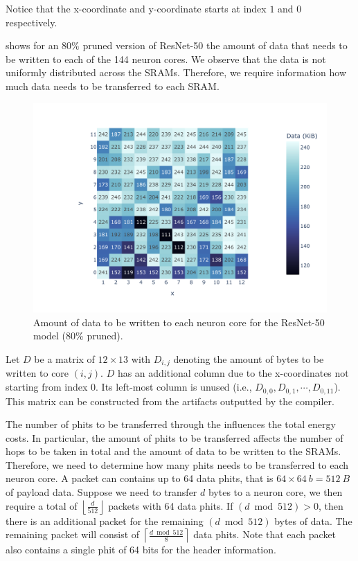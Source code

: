 Notice that the x-coordinate and y-coordinate starts at index $1$ and $0$ respectively.

 shows for an $80\%$ pruned version of ResNet-50 the amount of data that needs to be written to each of the 144 neuron cores.
We observe that the data is not uniformly distributed across the SRAMs.
Therefore, we require information how much data needs to be transferred to each SRAM.

\begin{figure}[hbtp]
    \centering
    \includegraphics[clip, trim=80 20 10 30, width=0.8\linewidth]{assets/resnet50_coredata_heatmap.pdf}
    \caption{Amount of data to be written to each neuron core for the ResNet-50 model (80\% pruned).}
    \label{fig:model_data_heapmap}
\end{figure}

Let $D$ be a matrix of $12 \times 13$ with $D_{i,j}$ denoting the amount of bytes to be written to core $\left( i,j \right)$.
$D$ has an additional column due to the x-coordinates not starting from index $0$.
Its left-most column is unused (i.e., $D_{0,0}, D_{0,1}, \cdots, D_{0,11}$).
This matrix can be constructed from the artifacts outputted by the compiler.

The number of phits to be transferred through the \confignoc{} influences the total energy costs.
In particular, the amount of phits to be transferred affects the number of hops to be taken in total and the amount of data to be written to the SRAMs.
Therefore, we need to determine how many phits needs to be transferred to each neuron core.
A packet can contains up to 64 data phits, that is $64 \times \SI{64}{b} = \SI{512}{B}$ of payload data.
Suppose we need to transfer $d$ bytes to a neuron core, we then require a total of $\left\lfloor \frac{d}{512} \right\rfloor$ packets with 64 data phits.
If $\left( d \bmod 512 \right) > 0$, then there is an additional packet for the remaining $\left( d \bmod 512 \right)$ bytes of data.
The remaining packet will consist of $\left\lceil \frac{d \bmod 512}{8}\right\rceil$ data phits.
Note that each packet also contains a single phit of 64 bits for the header information.

